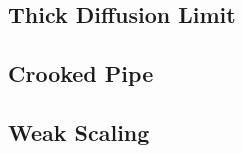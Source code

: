\documentclass[../doc.tex]{subfiles}
\begin{document}
\begin{table}
\centering
\caption{}
\label{}

\end{table}

\begin{table}
\centering
\caption{}
\label{}

\end{table}

\subsection{Thick Diffusion Limit}
\begin{table}
\centering
\caption{}
\label{}

\end{table}

\subsection{Crooked Pipe}
\begin{table}
\centering
\caption{}
\label{}
\begin{adjustbox}{max width = \textwidth}

\end{adjustbox}
\end{table}

\subsection{Weak Scaling}
\begin{table}
\centering
\caption{}
\label{}

\end{table}
\end{document}
